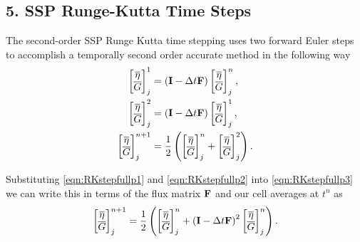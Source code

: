 \subsection{5. SSP Runge-Kutta Time Steps}
\label{subsec:RKstepdisp}
The second-order SSP Runge Kutta time stepping uses two forward Euler steps to accomplish a temporally second order accurate method in the following way
\begin{subequations}
	\label{eqn:RKstepfull}
	\begin{align}
	\label{eqn:RKstepfullp1}
	\begin{bmatrix}
	\overline{\eta} \\ \overline{G}
	\end{bmatrix}_j^1 &= \left(\mathbf{I} - \Delta t\mathbf{F} \right)\begin{bmatrix}
	\overline{\eta} \\ \overline{G}
	\end{bmatrix}^{n}_j, \\
	\label{eqn:RKstepfullp2}
	\begin{bmatrix}
	\overline{\eta} \\ \overline{G}
	\end{bmatrix}_j^2 &= \left(\mathbf{I} - \Delta t\mathbf{F} \right)\begin{bmatrix}
	\overline{\eta} \\ \overline{G}
	\end{bmatrix}_j^1, \\
	\label{eqn:RKstepfullp3}
	\begin{bmatrix}
	\overline{\eta} \\ \overline{G}
	\end{bmatrix}^{n+1}_j &= \frac{1}{2} \left(\begin{bmatrix}
	\overline{\eta} \\ \overline{G}
	\end{bmatrix}^{n}_j + \begin{bmatrix}
	\overline{\eta} \\ \overline{G}
	\end{bmatrix}_j^2\right) .
	\end{align}
\end{subequations}


Substituting \eqref{eqn:RKstepfullp1} and \eqref{eqn:RKstepfullp2} into \eqref{eqn:RKstepfullp3} we can write this in terms of the flux matrix $\mathbf{F}$ and our cell averages at $t^n$ as
\begin{equation*}
\begin{bmatrix}
\overline{\eta} \\ \overline{G}
\end{bmatrix}^{n+1}_j = \frac{1}{2} \left(\begin{bmatrix}
\overline{\eta} \\ \overline{G}
\end{bmatrix}^{n}_j + \left(\mathbf{I} - \Delta t\mathbf{F} \right)^2 \begin{bmatrix}
\overline{\eta} \\ \overline{G}
\end{bmatrix}^{n}_j\right).
\end{equation*}

